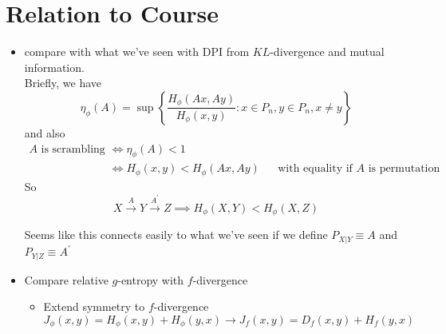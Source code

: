 \section{Relation to Course}
\begin{itemize}
    \item compare with what we've seen with DPI from $KL$-divergence and mutual information. \\ Briefly, we have
    \[\eta_{\phi}(A) = \sup \left\{\frac{H_{\phi}(Ax,Ay)}{H_{\phi}(x,y)}: x\in P_n, y\in P_n, x \neq y\right\}\]
    and also
    \begin{align*}
        A \text{ is scrambling } &\iff \eta_{\phi}(A) < 1 \\
        &\iff H_{\phi}(x,y) < H_{\phi}(Ax,Ay) &&\text{with equality if $A$ is permutation}
    \end{align*}
    So 
    \[X \xrightarrow{A} Y \xrightarrow{A^\prime} Z \implies H_{\phi}(X,Y) < H_{\phi}(X,Z)\]
    
    Seems like this connects easily to what we've seen if we define $P_{X|Y} \equiv A$ and $P_{Y|Z} \equiv A^\prime$
    \item Compare relative $g$-entropy with $f$-divergence
    \begin{itemize}
        \item Extend symmetry to $f$-divergence
        \[J_{\phi}(x,y) = H_{\phi}(x,y) + H_{\phi}(y,x) \longrightarrow J_{f}(x,y) = D_f(x,y) + H_f(y,x)\]
    \end{itemize}
\end{itemize}